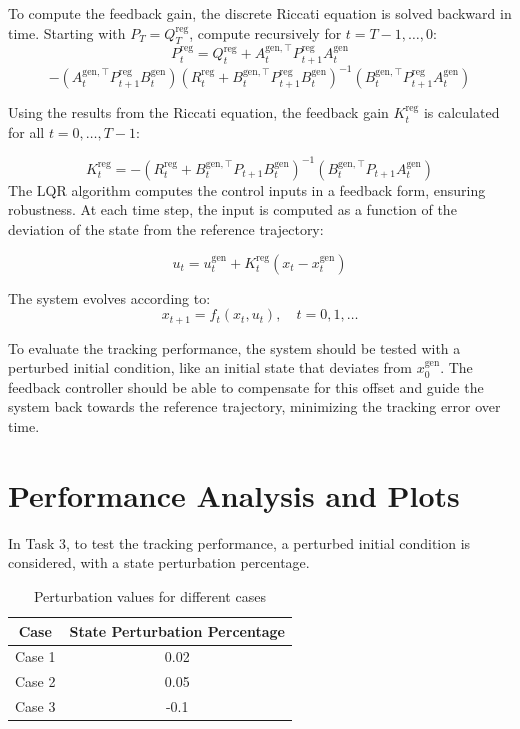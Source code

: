 \newpage

To compute the feedback gain, the discrete Riccati equation is solved backward in time. Starting with $P_T = Q_T^{\text{reg}}$, compute recursively for $t = T-1, \ldots, 0$:
\[
P_t^{\text{reg}} = Q_t^{\text{reg}} + A_t^{\text{gen}, \top} P_{t+1}^{\text{reg}} A_t^{\text{gen}} \]
\[- \left( A_t^{\text{gen}, \top} P_{t+1}^{\text{reg}} B_t^{\text{gen}} \right) \left( R_t^{\text{reg}} + B_t^{\text{gen}, \top} P_{t+1}^{\text{reg}} B_t^{\text{gen}} \right)^{-1} \left( B_t^{\text{gen}, \top} P_{t+1}^{\text{reg}} A_t^{\text{gen}} \right)
\]


Using the results from the Riccati equation, the feedback gain $K_t^{\text{reg}}$ is calculated for all $t = 0, \ldots, T-1$:

\[
K_t^{\text{reg}} = -(R_t^{\text{reg}} + B_t^{\text{gen}, \top} P_{t+1} B_t^{\text{gen}})^{-1} 
(B_t^{\text{gen}, \top} P_{t+1} A_t^{\text{gen}})
\]
The LQR algorithm computes the control inputs in a feedback form, ensuring robustness. At each time step, the input is computed as a function of the deviation of the state from the reference trajectory:

\[
u_t = u_t^{\text{gen}} + K_t^{\text{reg}}(x_t - x_t^{\text{gen}})
\]

The system evolves according to:
\[
x_{t+1} = f_t(x_t, u_t), \quad t = 0, 1, \ldots
\]

To evaluate the tracking performance, the system should be tested with a perturbed initial condition, like an initial state that deviates from $x_0^{\text{gen}}$. The feedback controller should be able to compensate for this offset and guide the system back towards the reference trajectory, minimizing the tracking error over time.

\newpage
\section{Performance Analysis and Plots}
In Task 3, to test the tracking performance, a perturbed initial condition is considered, with a state perturbation percentage.

\begin{table}[h!]
\centering
\begin{tabular}{|c|c|}
\hline
\textbf{Case} & \textbf{State Perturbation Percentage} \\ \hline
Case 1        & 0.02                                   \\ \hline
Case 2        & 0.05                                   \\ \hline
Case 3        & -0.1                                   \\ \hline
\end{tabular}
\caption{Perturbation values for different cases}
\label{tab:perturbation_cases}
\end{table}

